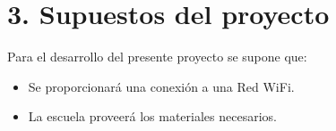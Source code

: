 \section{3. Supuestos del proyecto}
\label{sec:supuestos}


Para el desarrollo del presente proyecto se supone que:
\begin{itemize}
  \item Se proporcionará una conexión a una Red WiFi.
  \item La escuela proveerá los materiales necesarios.
\end{itemize}